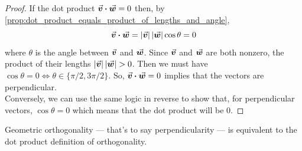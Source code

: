 \documentclass[MathsNotesBase.tex]{subfiles}
\begin{document}
{	
	\begin{proof}
		If the dot product ${ \vec{\bm{v}}\boldsymbol{\cdot}\vec{\bm{w}} = 0 }$ then, by \autoref{prop:dot_product_equals_product_of_lengths_and_angle},
		\[ \vec{\bm{v}}\boldsymbol{\cdot}\vec{\bm{w}} = \left\lvert\vec{\bm{v}}\right\rvert \left\lvert\vec{\bm{w}}\right\rvert \cos{\theta} = 0 \]
		where $\theta$ is the angle between $\vec{\bm{v}}$ and $\vec{\bm{w}}$. Since $\vec{\bm{v}}$ and $\vec{\bm{w}}$ are both nonzero, the product of their lengths ${ \left\lvert\vec{\bm{v}}\right\rvert \left\lvert\vec{\bm{w}}\right\rvert > 0 }$. Then we must have ${ \cos{\theta} = 0 \iff \theta \in \{ \pi/2, 3\pi/2 \}  }$. So, ${ \vec{\bm{v}}\boldsymbol{\cdot}\vec{\bm{w}} = 0 }$ implies that the vectors are perpendicular.\\
		Conversely, we can use the same logic in reverse to show that, for perpendicular vectors, ${ \cos{\theta} = 0 }$ which means that the dot product will be 0.
	\end{proof}
	\begin{corollary}
		Geometric orthogonality --- that's to say perpendicularity --- is equivalent to the dot product definition of orthogonality.
	\end{corollary}
}
	
\end{document}
